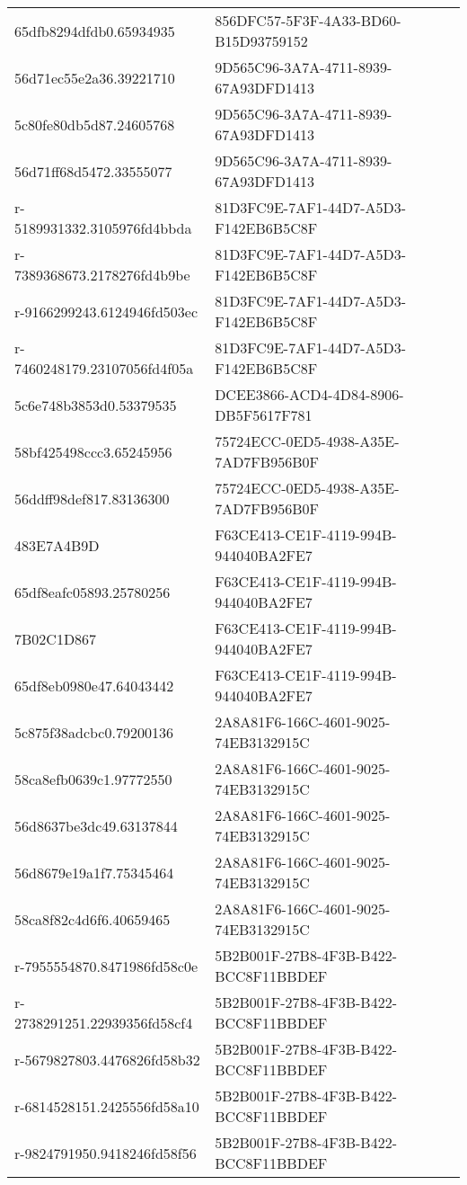 \begin{tabular}{ll}
65dfb8294dfdb0.65934935 & 856DFC57-5F3F-4A33-BD60-B15D93759152 \\
56d71ec55e2a36.39221710 & 9D565C96-3A7A-4711-8939-67A93DFD1413 \\
5c80fe80db5d87.24605768 & 9D565C96-3A7A-4711-8939-67A93DFD1413 \\
56d71ff68d5472.33555077 & 9D565C96-3A7A-4711-8939-67A93DFD1413 \\
r-5189931332.3105976fd4bbda & 81D3FC9E-7AF1-44D7-A5D3-F142EB6B5C8F \\
r-7389368673.2178276fd4b9be & 81D3FC9E-7AF1-44D7-A5D3-F142EB6B5C8F \\
r-9166299243.6124946fd503ec & 81D3FC9E-7AF1-44D7-A5D3-F142EB6B5C8F \\
r-7460248179.23107056fd4f05a & 81D3FC9E-7AF1-44D7-A5D3-F142EB6B5C8F \\
5c6e748b3853d0.53379535 & DCEE3866-ACD4-4D84-8906-DB5F5617F781 \\
58bf425498ccc3.65245956 & 75724ECC-0ED5-4938-A35E-7AD7FB956B0F \\
56ddff98def817.83136300 & 75724ECC-0ED5-4938-A35E-7AD7FB956B0F \\
483E7A4B9D & F63CE413-CE1F-4119-994B-944040BA2FE7 \\
65df8eafc05893.25780256 & F63CE413-CE1F-4119-994B-944040BA2FE7 \\
7B02C1D867 & F63CE413-CE1F-4119-994B-944040BA2FE7 \\
65df8eb0980e47.64043442 & F63CE413-CE1F-4119-994B-944040BA2FE7 \\
5c875f38adcbc0.79200136 & 2A8A81F6-166C-4601-9025-74EB3132915C \\
58ca8efb0639c1.97772550 & 2A8A81F6-166C-4601-9025-74EB3132915C \\
56d8637be3dc49.63137844 & 2A8A81F6-166C-4601-9025-74EB3132915C \\
56d8679e19a1f7.75345464 & 2A8A81F6-166C-4601-9025-74EB3132915C \\
58ca8f82c4d6f6.40659465 & 2A8A81F6-166C-4601-9025-74EB3132915C \\
r-7955554870.8471986fd58c0e & 5B2B001F-27B8-4F3B-B422-BCC8F11BBDEF \\
r-2738291251.22939356fd58cf4 & 5B2B001F-27B8-4F3B-B422-BCC8F11BBDEF \\
r-5679827803.4476826fd58b32 & 5B2B001F-27B8-4F3B-B422-BCC8F11BBDEF \\
r-6814528151.2425556fd58a10 & 5B2B001F-27B8-4F3B-B422-BCC8F11BBDEF \\
r-9824791950.9418246fd58f56 & 5B2B001F-27B8-4F3B-B422-BCC8F11BBDEF \\

\end{tabular}
